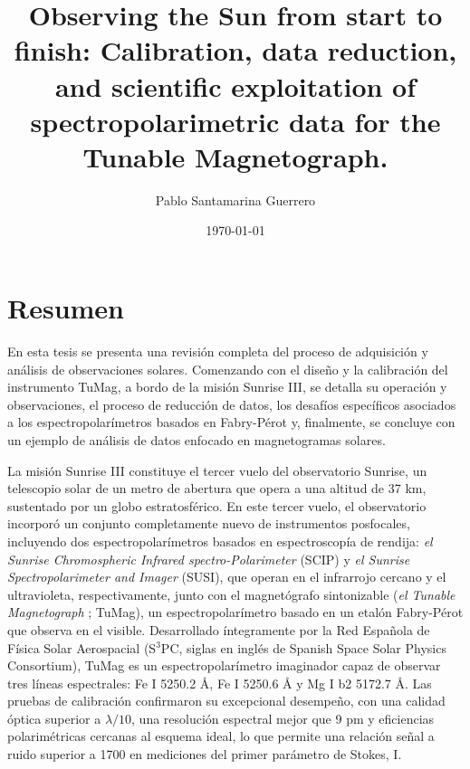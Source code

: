 \documentclass[12pt]{mythesis}
\title{Observing the Sun from start to finish: Calibration, data reduction, and scientific exploitation of spectropolarimetric data for the Tunable Magnetograph.}
\author{Pablo Santamarina Guerrero}
\date{\today}
\begin{document}
\frontmatter %
\maketitle
\cleardoublepage



\chapter*{Resumen}

En esta tesis se presenta una revisión completa del proceso de adquisición y análisis de observaciones solares. Comenzando con el diseño y la calibración del instrumento TuMag, a bordo de la misión Sunrise III, se detalla su operación y observaciones, el proceso de reducción de datos, los desafíos específicos asociados a los espectropolarímetros basados en Fabry-Pérot y, finalmente, se concluye con un ejemplo de análisis de datos enfocado en magnetogramas solares.

La misión Sunrise III constituye el tercer vuelo del observatorio Sunrise, un telescopio solar de un metro de abertura que opera a una altitud de 37 km, sustentado por un globo estratosférico. En este tercer vuelo, el observatorio incorporó un conjunto completamente nuevo de instrumentos posfocales, incluyendo dos espectropolarímetros basados en espectroscopía de rendija: \textit{el Sunrise Chromospheric Infrared spectro-Polarimeter} (SCIP) y \textit{el Sunrise Spectropolarimeter and Imager} (SUSI), que operan en el infrarrojo cercano y el ultravioleta, respectivamente, junto con el magnetógrafo sintonizable (\textit{el Tunable Magnetograph} ; TuMag), un espectropolarímetro basado en un etalón Fabry-Pérot que observa en el visible. Desarrollado íntegramente por la Red Española de Física Solar Aerospacial (S$^3$PC, siglas en inglés de Spanish Space Solar Physics Consortium), TuMag es un espectropolarímetro imaginador capaz de observar tres líneas espectrales: Fe I 5250.2 Å, Fe I 5250.6 Å y Mg I b2 5172.7 Å. Las pruebas de calibración confirmaron su excepcional desempeño, con una calidad óptica superior a $\lambda/10$, una resolución espectral mejor que 9 pm y eficiencias polarimétricas cercanas al esquema ideal, lo que permite una relación señal a ruido superior a 1700 en mediciones del primer parámetro de Stokes, I.
\end{document}
